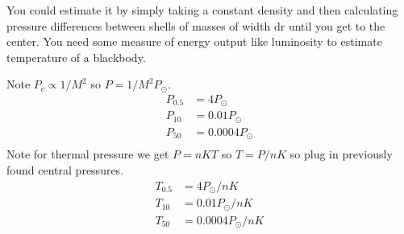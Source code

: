 \documentclass{homework}
\begin{document}
\question
\begin{alphaparts}
    \questionpart {} You could estimate it by simply taking a constant density and then calculating pressure differences between shells of masses of width dr until you get to the center.
    \questionpart {} You need some measure of energy output like luminosity to estimate temperature of a blackbody.
\end{alphaparts}


\question
\begin{alphaparts}
    \questionpart Note $P_c \propto 1/M^2$ so $P = 1/M^2 P_\odot$.
    \begin{align*}
        P_{0.5}	&=	4 P_\odot	\\
        P_{10}	&=	0.01 P_\odot	\\
        P_{50}	&=	0.0004 P_\odot	\\
    \end{align*}
    \questionpart Note for thermal pressure we get $P = nKT$ so $T = P / nK$ so plug in previously found central pressures.
    \begin{align*}
        T_{0.5}	&=	4 P_\odot / nK	\\
        T_{10}	&=	0.01 P_\odot / nK	\\
        T_{50}	&=	0.0004 P_\odot / nK	\\
    \end{align*} 
\end{alphaparts}
\end{document}
